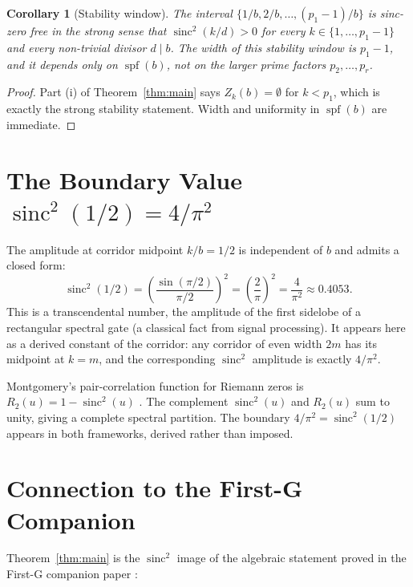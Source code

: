 \documentclass[11pt,reqno]{amsart}
\theoremstyle{plain}
\newtheorem{corollary}[theorem]{Corollary}
\theoremstyle{remark}
\DeclareMathOperator{\sinc}{sinc}
\DeclareMathOperator{\spf}{spf}
\begin{document}
\begin{corollary}[Stability window]\label{cor:stab}
The interval $\{1/b, 2/b, \ldots, (p_1 - 1)/b\}$ is sinc-zero free
in the strong sense that $\sinc^2(k/d) > 0$ for every
$k \in \{1, \ldots, p_1 - 1\}$ and every non-trivial divisor
$d \mid b$. The width of this stability window is $p_1 - 1$, and
it depends only on $\spf(b)$, not on the larger prime factors
$p_2, \ldots, p_r$.
\end{corollary}

\begin{proof}
Part (i) of Theorem~\ref{thm:main} says $Z_k(b) = \emptyset$ for
$k < p_1$, which is exactly the strong stability statement.
Width and uniformity in $\spf(b)$ are immediate.
\end{proof}

\section{The Boundary Value $\sinc^2(1/2) = 4/\pi^2$}\label{sec:boundary}

The amplitude at corridor midpoint $k/b = 1/2$ is independent of
$b$ and admits a closed form:
\begin{equation}\label{eq:fourpi2}
  \sinc^2(1/2) = \left( \frac{\sin(\pi/2)}{\pi/2} \right)^{\!2}
              = \left( \frac{2}{\pi} \right)^{\!2}
              = \frac{4}{\pi^2} \approx 0.4053.
\end{equation}
This is a transcendental number, the amplitude of the first
sidelobe of a rectangular spectral gate (a classical fact from
signal processing). It appears here as a derived constant of the
corridor: any corridor of even width $2m$ has its midpoint at
$k = m$, and the corresponding $\sinc^2$ amplitude is exactly
$4/\pi^2$.

Montgomery's pair-correlation function for Riemann zeros is
$R_2(u) = 1 - \sinc^2(u)$ \cite{Montgomery1973}. The complement
$\sinc^2(u)$ and $R_2(u)$ sum to unity, giving a complete spectral
partition. The boundary $4/\pi^2 = \sinc^2(1/2)$ appears in both
frameworks, derived rather than imposed.

\section{Connection to the First-G Companion}\label{sec:firstG}

Theorem~\ref{thm:main} is the $\sinc^2$ image of the algebraic
statement proved in the First-G companion paper \cite{J41}:
\end{document}
